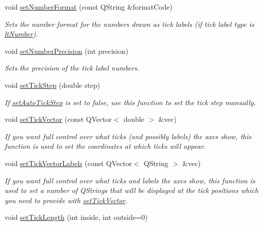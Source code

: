 \begin{DoxyCompactItemize}
void \hyperlink{classQCPAxis_ae585a54dc2aac662e90a2ca82f002590}{set\+Number\+Format} (const Q\+String \&format\+Code)
\begin{DoxyCompactList}\small\item\em Sets the number format for the numbers drawn as tick labels (if tick label type is \hyperlink{classQCPAxis_a4a7da0166f755f5abac23b765d184cada7f1eacf3b73adaefd334bea04e094b7e}{lt\+Number}). \end{DoxyCompactList}\item 
void \hyperlink{classQCPAxis_a21dc8023ad7500382ad9574b48137e63}{set\+Number\+Precision} (int precision)
\begin{DoxyCompactList}\small\item\em Sets the precision of the tick label numbers. \end{DoxyCompactList}\item 
void \hyperlink{classQCPAxis_af727db0acc6492c4c774c0700e738205}{set\+Tick\+Step} (double step)
\begin{DoxyCompactList}\small\item\em If \hyperlink{classQCPAxis_a99fe77b034e06f5b723995beab96e741}{set\+Auto\+Tick\+Step} is set to false, use this function to set the tick step manually. \end{DoxyCompactList}\item 
void \hyperlink{classQCPAxis_a871db94c5d796c80fcbe1a9d4506e27e}{set\+Tick\+Vector} (const Q\+Vector$<$ double $>$ \&vec)
\begin{DoxyCompactList}\small\item\em If you want full control over what ticks (and possibly labels) the axes show, this function is used to set the coordinates at which ticks will appear. \end{DoxyCompactList}\item 
void \hyperlink{classQCPAxis_a921d3ba3853ca3bd2cce3459f7a243ed}{set\+Tick\+Vector\+Labels} (const Q\+Vector$<$ Q\+String $>$ \&vec)
\begin{DoxyCompactList}\small\item\em If you want full control over what ticks and labels the axes show, this function is used to set a number of Q\+Strings that will be displayed at the tick positions which you need to provide with \hyperlink{classQCPAxis_a871db94c5d796c80fcbe1a9d4506e27e}{set\+Tick\+Vector}. \end{DoxyCompactList}\item 
void \hyperlink{classQCPAxis_a62ec40bebe3540e9c1479a8fd2be3b0d}{set\+Tick\+Length} (int inside, int outside=0)

\end{DoxyCompactItemize}
